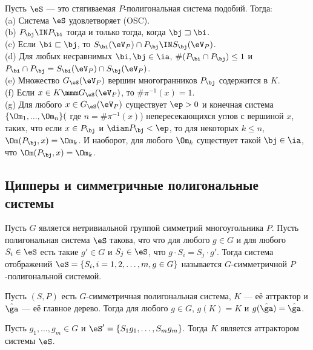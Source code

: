 \begin{theorem}\label{refsys} 
Пусть $\eS$ --- это стягиваемая $P$-полигональная система подобий. Тогда:\\
(a) Система $\eS$ удовлетворяет (OSC).\\
(b) $P_\bj\IN P_\bi$ тогда и только тогда, когда  $\bj\sqsupset\bi$.\\
(c) Если $\bi\sqsubset\bj$, то  $ S_\bi(\eV_P)\cap P_\bj\IN S_\bj(\eV_P)$.\\
(d) Для любых несравнимых $\bi,\bj\in \ia$, $\#(P_\bi\cap P_\bj)\le 1$ и $P_\bi\cap P_\bj=S_\bi(\eV_P)\cap S_\bj(\eV_P)$.\\
(e) Множество  $G_\eS(\eV_P)$ вершин многогранников $P_\bj$ содержится в $K$.\\
(f) Если $x\in K\mmm G_\eS(\eV_P)$, то $\#\pi^{-1}(x)=1$.\\
(g) Для любого $x\in G_\eS(\eV_P)$ существует $\ep>0$ и конечная система $\{\Om_1,...,\Om_n\} ($ где $n=\#\pi^{-1}(x)$) непересекающихся углов с вершиной  $x$, таких, что если $x\in P_\bj$ и $\diam P_\bj<\ep$, то для некоторых $k\le n$, $\Om(P_\bj,x)=\Om_k$. И наоборот, для любого $\Om_k$ существует такой $\bj\in\ia$, что  $\Om(P_\bj,x)=\Om_k$.
\end{theorem}

\subsection{Ципперы и симметричные полигональные системы}

\begin{definition}
Пусть $G$ является нетривиальной группой симметрий многоугольника $P$. Пусть полигональная система $\eS$ такова, что что для любого $g\in G$ и для любого $S_i\in \eS$ есть такие $g'\in G$ и $S_j\in \eS$, что $g\cdot S_i=S_j\cdot g'$. Тогда система отображений $\eS=\{S_i,i=1,2,\ldots,m, g\in G \}$ называется $G$-симметричной $P$-полигональной системой.
\end{definition}

\begin{theorem}
Пусть $(S,P)$ есть $G$-симметричная полигональная система, $K$ --- её аттрактор и $\hat\ga$ --- её главное дерево. Тогда для любого $g\in G$, $g(K)=K$ и $g(\hat\ga)=\hat\ga$.
\end{theorem}

\begin{corollary}
Пусть $g_1,\ldots ,g_m\in G$ и $\eS'=\{S_1g_1,\ldots ,S_m g_m\}$. Тогда $K$ является аттрактором системы $\eS$.
\end{corollary}

